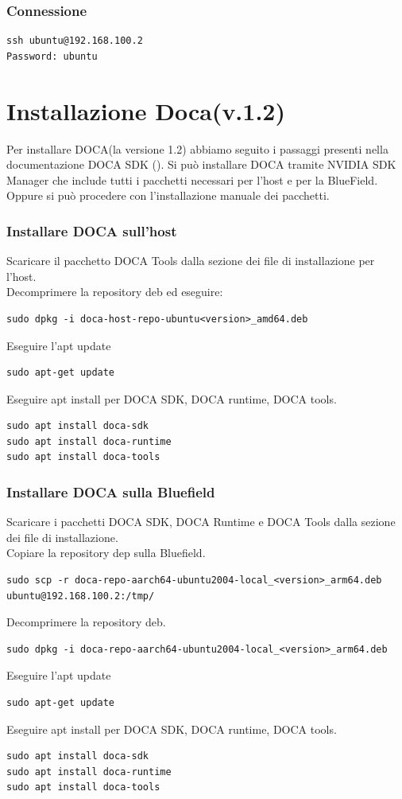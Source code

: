 \documentclass[binding=0.6cm]{sapthesis}
\theoremstyle{definition}
\begin{document}
\subsubsection*{Connessione}
\begin{verbatim}
ssh ubuntu@192.168.100.2
Password: ubuntu
\end{verbatim}


\section{Installazione Doca(v.1.2)}
Per installare DOCA(la versione 1.2) abbiamo seguito i passaggi presenti  nella
documentazione DOCA SDK (\cite{doca doc url filter}). Si può installare DOCA tramite 
NVIDIA SDK Manager che include tutti i pacchetti necessari per l'host e per la BlueField.
Oppure si può procedere con l'installazione manuale dei pacchetti.
\subsubsection*{Installare DOCA sull'host}
Scaricare il pacchetto DOCA Tools dalla sezione dei file di installazione per l'host.\\
Decomprimere la repository deb ed eseguire: 
\begin{verbatim}
sudo dpkg -i doca-host-repo-ubuntu<version>_amd64.deb
\end{verbatim}
Eseguire l'apt update
\begin{verbatim}
sudo apt-get update
\end{verbatim}
Eseguire  apt install per DOCA SDK, DOCA runtime, DOCA tools.
\begin{verbatim}
sudo apt install doca-sdk
sudo apt install doca-runtime
sudo apt install doca-tools
\end{verbatim}
\subsubsection*{Installare DOCA sulla Bluefield}


Scaricare i pacchetti DOCA SDK, DOCA Runtime e DOCA Tools dalla sezione dei file di installazione.\\
Copiare la repository dep sulla Bluefield.
\begin{verbatim}
sudo scp -r doca-repo-aarch64-ubuntu2004-local_<version>_arm64.deb 
ubuntu@192.168.100.2:/tmp/
\end{verbatim}
Decomprimere la repository deb.
\begin{verbatim}
sudo dpkg -i doca-repo-aarch64-ubuntu2004-local_<version>_arm64.deb
\end{verbatim}
Eseguire l'apt update
\begin{verbatim}
sudo apt-get update
\end{verbatim}
Eseguire  apt install per DOCA SDK, DOCA runtime, DOCA tools.
\begin{verbatim}
sudo apt install doca-sdk
sudo apt install doca-runtime
sudo apt install doca-tools
\end{verbatim}
\end{document}

